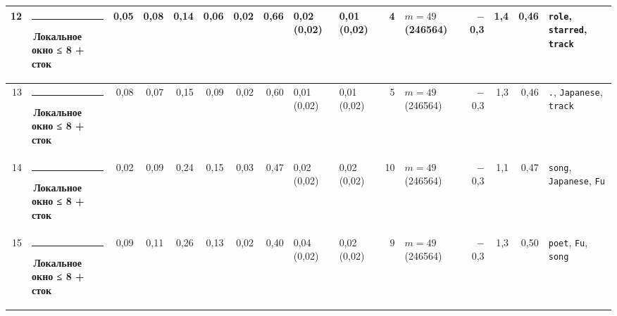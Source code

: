 \documentclass[10pt]{article}
\begin{document}
\begin{minipage}{\linewidth}
\begin{center}
{\begin{tabular}{|r|l|r|r|r|r|r|r|l|l|r|l|r|r|r|l|}
12 & \textcolor[HTML]{1BAF7A}{\rule{0.62em}{0.62em}}\,\textbf{Локальное окно ≤ 8 + сток} & 0,05 & 0,08 & 0,14 & 0,06 & 0,02 & 0,66 & 0,02 (0,02) & 0,01 (0,02) & 4 & $m{=}49$ (246564) & $-$0,3 & 1,4 & 0,46 & \texttt{\textvisiblespace{}role}, \texttt{\textvisiblespace{}starred}, \texttt{\textvisiblespace{}track} \\ \hline
13 & \textcolor[HTML]{1BAF7A}{\rule{0.62em}{0.62em}}\,\textbf{Локальное окно ≤ 8 + сток} & 0,08 & 0,07 & 0,15 & 0,09 & 0,02 & 0,60 & 0,01 (0,02) & 0,01 (0,02) & 5 & $m{=}49$ (246564) & $-$0,3 & 1,3 & 0,46 & \texttt{\textvisiblespace{}.}, \texttt{\textvisiblespace{}Japanese}, \texttt{\textvisiblespace{}track} \\ \hline
14 & \textcolor[HTML]{1BAF7A}{\rule{0.62em}{0.62em}}\,\textbf{Локальное окно ≤ 8 + сток} & 0,02 & 0,09 & 0,24 & 0,15 & 0,03 & 0,47 & 0,02 (0,02) & 0,02 (0,02) & 10 & $m{=}49$ (246564) & $-$0,3 & 1,1 & 0,47 & \texttt{\textvisiblespace{}song}, \texttt{\textvisiblespace{}Japanese}, \texttt{\textvisiblespace{}Fu} \\ \hline
15 & \textcolor[HTML]{1BAF7A}{\rule{0.62em}{0.62em}}\,\textbf{Локальное окно ≤ 8 + сток} & 0,09 & 0,11 & 0,26 & 0,13 & 0,02 & 0,40 & 0,04 (0,02) & 0,02 (0,02) & 9 & $m{=}49$ (246564) & $-$0,3 & 1,3 & 0,50 & \texttt{\textvisiblespace{}poet}, \texttt{\textvisiblespace{}Fu}, \texttt{\textvisiblespace{}song} \\ \hline
\hline\end{tabular}}\end{center}
\end{minipage}
\par\vspace{0.4em}
\end{document}
